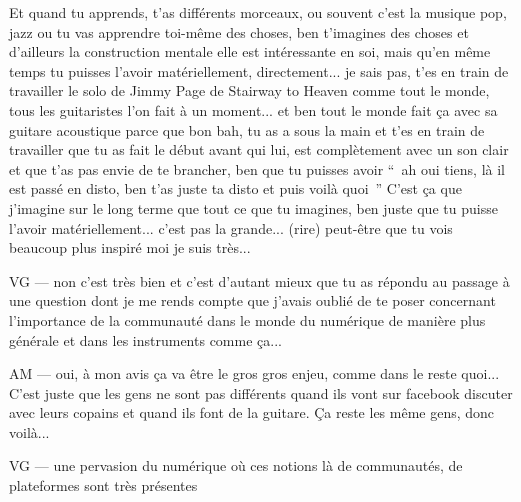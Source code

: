 Et quand tu apprends, t'as différents morceaux, ou souvent c'est la musique pop, jazz ou tu vas apprendre toi-même des choses, ben t'imagines des choses et d'ailleurs la construction mentale elle est intéressante en soi, mais qu'en même temps tu puisses l'avoir matériellement, directement... je sais pas, t'es en train de travailler le solo de Jimmy Page de Stairway to Heaven comme tout le monde, tous les guitaristes l'on fait à un moment... et ben tout le monde fait ça avec sa guitare acoustique parce que bon bah, tu as a sous la main et t'es en train de travailler que tu as fait le début avant qui lui, est complètement avec un son clair et que t'as pas envie de te brancher, ben que tu puisses avoir “ ah oui tiens, là il est passé en disto, ben t'as juste ta disto et puis voilà quoi ” C'est ça que j'imagine sur le long terme que tout ce que tu imagines, ben juste que tu puisse l'avoir matériellement... c'est pas la grande... (rire) peut-être que tu vois beaucoup plus inspiré moi je suis très... 

VG — non c'est très bien et c'est d'autant mieux que tu as répondu au passage à une question dont je me rends compte que j'avais oublié de te poser concernant l'importance de la communauté dans le monde du numérique de manière plus générale et dans les instruments comme ça... 

AM — oui, à mon avis ça va être le gros gros enjeu, comme dans le reste quoi... C'est juste que les gens ne sont pas différents quand ils vont sur facebook discuter avec leurs copains et quand ils font de la guitare. Ça reste les même gens, donc voilà... 

VG — une pervasion du numérique où ces notions là de communautés, de plateformes sont très présentes

